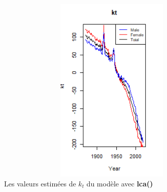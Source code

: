 \documentclass[french]{report}
\begin{document}
\begin{figure}[hhhhhhhh!]
    \centering
    \includegraphics[width=15cm, height=9cm]{visualisation_param_kt.png}
    \caption{Les valeurs estimées de ${k}_{t}$ du modèle avec \textbf{lca()}}
    \label{fig:kt.png}
\end{figure}
\end{document}
